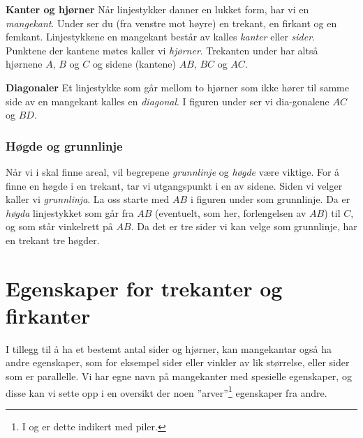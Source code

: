\begin{comment}
\reg[Samsvarande vinklar]{
	Vinkler med eit høgre eller venstre vinkelbein felles, kallast \textit{samsvarende vinkler}. I figuren under er dei markerte vinklane samsvarande fordi alle tre har den raude linja som venstre vinkelbein.
\fig{vink4}
	Vinklar med parvis parallelle høgre og venstre vinkelbein er like store.
\fig{vink4b}
}
\end{comment}
\newpage
\textbf{Kanter og hjørner} \os
Når linjestykker danner en lukket form, har vi en \textit{mangekant}. Under ser du (fra venstre mot høyre) en trekant, en firkant og en femkant.
Linjestykkene en mangekant består av kalles \textit{kanter} eller \textit{sider}. Punktene der kantene møtes kaller vi \textit{hjørner}. Trekanten under har altså hjørnene $ A $, $ B $ og $ C $ og sidene (kantene) $ AB $, $ BC $ og $ AC $.
 \vsk

\textbf{Diagonaler} \os
Et linjestykke som går mellom to hjørner som ikke hører til samme side av en mangekant kalles en \textit{diagonal}. I figuren under ser vi dia-gonalene $ AC $ og $ BD $.
\newpage
\subsubsection{Høgde og grunnlinje \label{grunnlinje}}
Når vi i  skal finne areal, vil begrepene \textit{grunnlinje} og \textit{høgde} være viktige. For å finne en høgde i en trekant, tar vi utgangspunkt i en av sidene. Siden vi velger kaller vi \textit{grunnlinja}. La oss starte med $ AB $ i figuren under som grunnlinje. Da er \textit{høgda} linjestykket som går fra $ AB $ (eventuelt, som her, forlengelsen av $ AB $) til $ C $, og som står vinkelrett på $ AB $.
Da det er tre sider vi kan velge som grunnlinje, har en trekant tre høgder.
\section{Egenskaper for trekanter og firkanter}
I tillegg til å ha et bestemt antal sider og hjørner, kan mangekantar også ha andre egenskaper, som for eksempel sider eller vinkler av lik størrelse, eller sider som er parallelle. Vi har egne navn på mangekanter med spesielle egenskaper, og disse kan vi sette opp i en oversikt der noen ''arver''\footnote{I  og  er dette indikert med piler.} egenskaper fra andre.\regv


